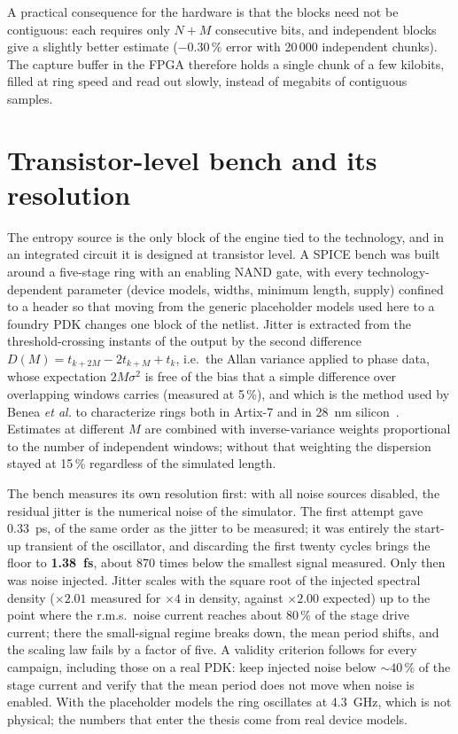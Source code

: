 A practical consequence for the hardware is that the blocks need not be
contiguous: each requires only $N+M$ consecutive bits, and independent
blocks give a slightly better estimate ($-0.30\,\%$ error with 20\,000
independent chunks). The capture buffer in the FPGA therefore holds a
single chunk of a few kilobits, filled at ring speed and read out slowly,
instead of megabits of contiguous samples.

\section{Transistor-level bench and its resolution}
\label{sec:spice}

The entropy source is the only block of the engine tied to the
technology, and in an integrated circuit it is designed at transistor
level. A SPICE bench was built around a five-stage ring with an enabling
NAND gate, with every technology-dependent parameter (device models,
widths, minimum length, supply) confined to a header so that moving from
the generic placeholder models used here to a foundry \ac{PDK} changes
one block of the netlist. Jitter is extracted from the threshold-crossing
instants of the output by the second difference
$D(M) = t_{k+2M} - 2t_{k+M} + t_k$, i.e.\ the Allan variance applied to
phase data, whose expectation $2M\sigma^2$ is free of the bias that a
simple difference over overlapping windows carries (measured at 5\,\%),
and which is the method used by Benea \emph{et al.} to characterize rings
both in Artix-7 and in 28~nm silicon~\cite{benea_2024_flicker}. Estimates
at different $M$ are combined with inverse-variance weights proportional
to the number of independent windows; without that weighting the
dispersion stayed at 15\,\% regardless of the simulated length.

The bench measures its own resolution first: with all noise sources
disabled, the residual jitter is the numerical noise of the simulator.
The first attempt gave 0.33~ps, of the same order as the jitter to be
measured; it was entirely the start-up transient of the oscillator, and
discarding the first twenty cycles brings the floor to \textbf{1.38~fs},
about 870 times below the smallest signal measured. Only then was noise
injected.
Jitter scales with the square root of the injected spectral density
($\times2.01$ measured for $\times4$ in density, against $\times2.00$
expected) up to the point where the r.m.s.\ noise current reaches
about 80\,\% of the stage drive current; there the small-signal regime
breaks down, the mean period shifts, and the scaling law fails by a
factor of five. A validity criterion follows for every campaign,
including those on a real \ac{PDK}: keep injected noise below $\sim40\,\%$
of the stage current and verify that the mean period does not move when
noise is enabled. With the placeholder models the ring oscillates at
4.3~GHz, which is not physical; the numbers that enter the thesis come
from real device models.

